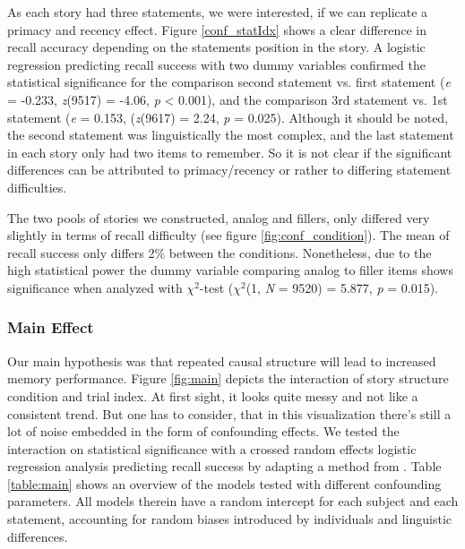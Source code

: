 \documentclass[a4paper,man,natbib,floatsintext,import]{apa6}
\begin{document}
As each story had three statements, we were interested, if we can replicate a primacy and recency effect. Figure \ref{conf_statIdx} shows a clear difference in recall accuracy depending on the statements position in the story. A logistic regression predicting recall success with two dummy variables confirmed the statistical significance for the comparison second statement vs. first statement (\textit{e} = -0.233, \textit{z}(9517) = -4.06, \textit{p} < 0.001), and the comparison 3rd statement vs. 1st statement (\textit{e} = 0.153, (\textit{z}(9617) = 2.24, \textit{p} = 0.025). Although it should be noted, the second statement was linguistically the most complex, and the last statement in each story only had two items to remember. So it is not clear if the significant differences can be attributed to primacy/recency or rather to differing statement difficulties.

The two pools of stories we constructed, analog and fillers, only differed very slightly in terms of recall difficulty (see figure \ref{fig:conf_condition}). The mean of recall success only differs 2\% between the conditions. Nonetheless, due to the high statistical power the dummy variable comparing analog to filler items shows significance when analyzed with ${\chi}^2$-test (\textit{${\chi}^2$}(1, \textit{N} = 9520) = 5.877, \textit{p} = 0.015).

\subsubsection{Main Effect}
Our main hypothesis was that repeated causal structure will lead to increased memory performance. Figure \ref{fig:main} depicts the interaction of story structure condition and trial index. At first sight, it looks quite messy and not like a consistent trend. But one has to consider, that in this visualization there's still a lot of noise embedded in the form of confounding effects. We tested the interaction on statistical significance with a crossed random effects logistic regression analysis predicting recall success by adapting a method from \cite{Baayen2008}. Table \ref{table:main} shows an overview of the models tested with different confounding parameters. All models therein have a random intercept for each subject and each statement, accounting for random biases introduced by individuals and linguistic differences.
\end{document}
